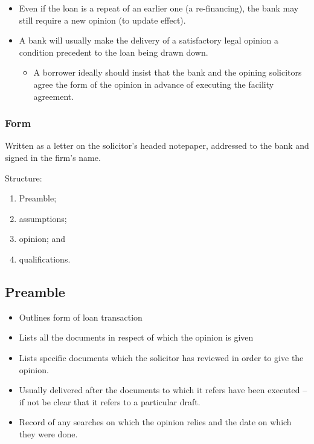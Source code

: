 \documentclass[
]{article}
\providecommand{\tightlist}{%
  \setlength{\itemsep}{0pt}\setlength{\parskip}{0pt}}
\begin{document}
\begin{itemize}
\tightlist
\item
  Even if the loan is a repeat of an earlier one (a re-financing), the
  bank may still require a new opinion (to update effect).
\item
  A bank will usually make the delivery of a satisfactory legal opinion
  a condition precedent to the loan being drawn down.

  \begin{itemize}
  \tightlist
  \item
    A borrower ideally should insist that the bank and the opining
    solicitors agree the form of the opinion in advance of executing the
    facility agreement.
  \end{itemize}
\end{itemize}

\hypertarget{form}{%
\subsubsection{Form}\label{form}}

Written as a letter on the solicitor's headed notepaper, addressed to
the bank and signed in the firm's name.

Structure:

\begin{enumerate}
\tightlist
\item
  Preamble;
\item
  assumptions;
\item
  opinion; and
\item
  qualifications.
\end{enumerate}

\hypertarget{preamble}{%
\subsection{Preamble}\label{preamble}}

\begin{itemize}
\tightlist
\item
  Outlines form of loan transaction
\item
  Lists all the documents in respect of which the opinion is given
\item
  Lists specific documents which the solicitor has reviewed in order to
  give the opinion.
\item
  Usually delivered after the documents to which it refers have been
  executed -- if not be clear that it refers to a particular draft.
\item
  Record of any searches on which the opinion relies and the date on
  which they were done.
\end{itemize}
\end{document}
